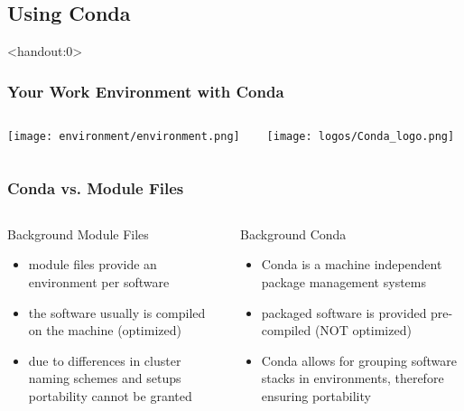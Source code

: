 \subsection{Using Conda}

\begin{frame}<handout:0> 
  \frametitle{Your Work Environment with Conda}
  \begin{columns}
    \begin{column}{0.5\textwidth}\centering
      \texttt{[image: environment/environment.png]}
    \end{column}
    \begin{column}{0.5\textwidth}\centering
      \texttt{[image: logos/Conda\_logo.png]}   
    \end{column}
  \end{columns}
\end{frame}

\begin{frame}
  \frametitle{Conda vs. Module Files}
  \begin{columns}
    \begin{column}{0.5\textwidth}
      Background Module Files
      \begin{itemize}
       \item module files provide an environment per software
       \item the software usually is compiled on the machine (optimized)
       \item due to differences in cluster naming schemes and setups portability cannot be granted
      \end{itemize}
    \end{column}
    \begin{column}{0.5\textwidth}
      Background Conda
      \begin{itemize}
       \item Conda is a machine independent package management systems
       \item packaged software is provided pre-compiled (NOT optimized)
       \item Conda allows for grouping software stacks in environments, therefore ensuring portability
      \end{itemize}
    \end{column}
  \end{columns}
\end{frame}


